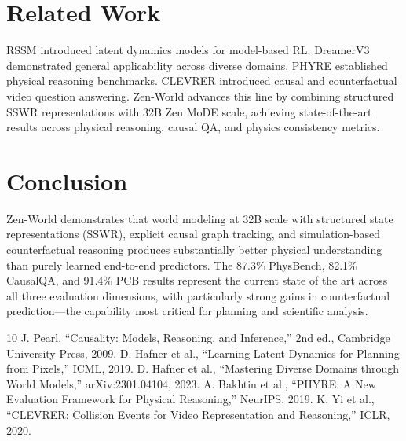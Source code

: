 \documentclass[11pt,a4paper]{article}
\begin{document}
\section{Related Work}

RSSM \cite{hafner2019learning} introduced latent dynamics models for model-based RL.
DreamerV3 \cite{hafner2023mastering} demonstrated general applicability across diverse domains.
PHYRE \cite{bakhtin2019phyre} established physical reasoning benchmarks. CLEVRER
\cite{yi2019clevrer} introduced causal and counterfactual video question answering.
Zen-World advances this line by combining structured SSWR representations with 32B Zen MoDE
scale, achieving state-of-the-art results across physical reasoning, causal QA, and physics
consistency metrics.

\section{Conclusion}

Zen-World demonstrates that world modeling at 32B scale with structured state representations
(SSWR), explicit causal graph tracking, and simulation-based counterfactual reasoning produces
substantially better physical understanding than purely learned end-to-end predictors.
The 87.3\% PhysBench, 82.1\% CausalQA, and 91.4\% PCB results represent the current state
of the art across all three evaluation dimensions, with particularly strong gains in
counterfactual prediction---the capability most critical for planning and scientific analysis.

\begin{thebibliography}{10}
 J. Pearl, ``Causality: Models, Reasoning, and Inference,'' 2nd ed., Cambridge University Press, 2009.
 D. Hafner et al., ``Learning Latent Dynamics for Planning from Pixels,'' ICML, 2019.
 D. Hafner et al., ``Mastering Diverse Domains through World Models,'' arXiv:2301.04104, 2023.
 A. Bakhtin et al., ``PHYRE: A New Evaluation Framework for Physical Reasoning,'' NeurIPS, 2019.
 K. Yi et al., ``CLEVRER: Collision Events for Video Representation and Reasoning,'' ICLR, 2020.
\end{thebibliography}
\end{document}
